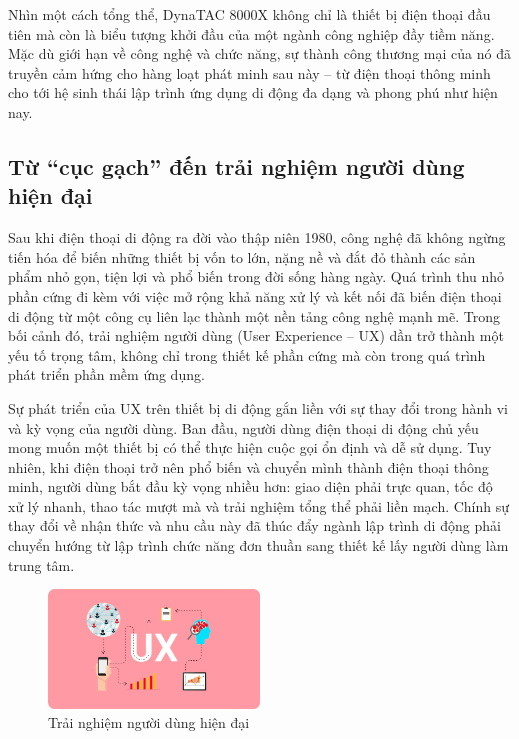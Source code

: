 \begin{flushleft}
  \hspace*{0.8cm}Nhìn một cách tổng thể, DynaTAC 8000X không chỉ là thiết bị điện thoại đầu tiên mà còn là biểu tượng khởi đầu của một ngành công nghiệp đầy tiềm năng. Mặc dù giới hạn về công nghệ và chức năng, sự thành công thương mại của nó đã truyền cảm hứng cho hàng loạt phát minh sau này – từ điện thoại thông minh cho tới hệ sinh thái lập trình ứng dụng di động đa dạng và phong phú như hiện nay.
\end{flushleft}

\subsection{Từ “cục gạch” đến trải nghiệm người dùng hiện đại}
\renewcommand{\labelitemi}{--}    
    \begin{flushleft}
        \hspace*{0.8cm}Sau khi điện thoại di động ra đời vào thập niên 1980, công nghệ đã không ngừng tiến hóa để biến những thiết bị vốn to lớn, nặng nề và đắt đỏ thành các sản phẩm nhỏ gọn, tiện lợi và phổ biến trong đời sống hàng ngày. Quá trình thu nhỏ phần cứng đi kèm với việc mở rộng khả năng xử lý và kết nối đã biến điện thoại di động từ một công cụ liên lạc thành một nền tảng công nghệ mạnh mẽ. Trong bối cảnh đó, trải nghiệm người dùng (User Experience – UX) dần trở thành một yếu tố trọng tâm, không chỉ trong thiết kế phần cứng mà còn trong quá trình phát triển phần mềm ứng dụng.
    \end{flushleft}

    \begin{flushleft}
      \hspace*{0.8cm}Sự phát triển của UX trên thiết bị di động gắn liền với sự thay đổi trong hành vi và kỳ vọng của người dùng. Ban đầu, người dùng điện thoại di động chủ yếu mong muốn một thiết bị có thể thực hiện cuộc gọi ổn định và dễ sử dụng. Tuy nhiên, khi điện thoại trở nên phổ biến và chuyển mình thành điện thoại thông minh, người dùng bắt đầu kỳ vọng nhiều hơn: giao diện phải trực quan, tốc độ xử lý nhanh, thao tác mượt mà và trải nghiệm tổng thể phải liền mạch. Chính sự thay đổi về nhận thức và nhu cầu này đã thúc đẩy ngành lập trình di động phải chuyển hướng từ lập trình chức năng đơn thuần sang thiết kế lấy người dùng làm trung tâm.
    \end{flushleft}

\begin{figure}[h]
  \centering
  \includegraphics[width=0.5\textwidth]{images/Ux.jpg}
  \caption{Trải nghiệm người dùng hiện đại}
  \label{fig:fig5}
\end{figure}

